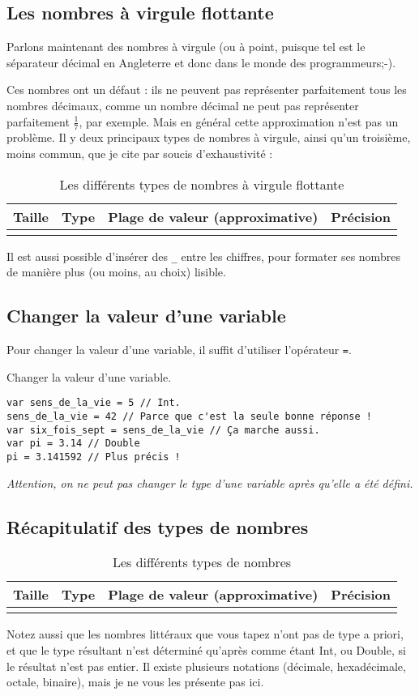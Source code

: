\subsection{Les nombres à virgule flottante}

Parlons maintenant des nombres à virgule (ou à point, puisque tel est le séparateur décimal en Angleterre et donc dans le monde des programmeurs;-).

Ces nombres ont un  défaut :
ils ne peuvent pas représenter parfaitement tous les nombres décimaux,
comme un nombre décimal ne peut pas représenter parfaitement
\begin{math} \frac{1}{7} \end{math}, par exemple.
Mais en général cette approximation n'est pas un problème.
Il y deux principaux types de nombres à virgule, ainsi qu'un troisième,
moins commun, que je cite par soucis d'exhaustivité :
\begin{longtabu} to \linewidth {|X[3,l,m]|X[1,l,m]|X[4,r,m]|X[3,r,m]|}
\hline Taille & Type & Plage de valeur (approximative) & Précision \\ \hline
\endhead

\caption{Les différents types de nombres à virgule flottante}
\end{longtabu}

Il est aussi possible d'insérer des \verb"_" entre les chiffres,
pour formater ses nombres de manière plus (ou moins, au choix) lisible.

\subsection{Changer la valeur d'une variable}
Pour changer la valeur d'une variable, il suffit d'utiliser l'opérateur \verb"=".
\begin{listing}[h]
\caption{Changer la valeur d'une variable.}
\begin{verbatim}
var sens_de_la_vie = 5 // Int.
sens_de_la_vie = 42 // Parce que c'est la seule bonne réponse !
var six_fois_sept = sens_de_la_vie // Ça marche aussi.
var pi = 3.14 // Double
pi = 3.141592 // Plus précis !
\end{verbatim}
\end{listing}

\emph{Attention, on ne peut pas changer le type d'une variable après qu'elle a été défini.}
\subsection{Récapitulatif des types de nombres}
\begin{longtabu} to \linewidth {|X[3,l,m]|X[1,l,m]|X[4,r,m]|X[2,r,m]|}
\hline Taille & Type & Plage de valeur (approximative) & Précision \\ \hline
\endhead


\caption{Les différents types de nombres}
\end{longtabu}
Notez aussi que les nombres littéraux que vous tapez n'ont pas de type a priori, et que le type résultant n'est déterminé qu'après comme étant Int, ou Double, si le résultat n'est pas entier. Il existe plusieurs notations (décimale, hexadécimale, octale, binaire), mais je ne vous les présente pas ici.

